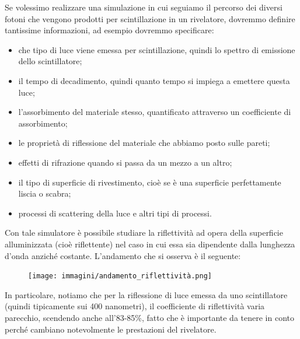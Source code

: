 Se volessimo realizzare una simulazione in cui seguiamo il percorso dei diversi fotoni che vengono prodotti per scintillazione in un rivelatore, dovremmo definire tantissime informazioni, ad esempio dovremmo specificare:

\begin{itemize}
   \item che tipo di luce viene emessa per scintillazione, quindi lo spettro di emissione dello scintillatore;
   \item il tempo di decadimento, quindi quanto tempo si impiega a emettere questa luce;
   \item l'assorbimento del materiale stesso, quantificato attraverso un coefficiente di assorbimento;
   \item le proprietà di riflessione del materiale che abbiamo posto sulle pareti;
   \item effetti di rifrazione quando si passa da un mezzo a un altro;
   \item il tipo di superficie di rivestimento, cioè se è una superficie perfettamente liscia o scabra;
   \item processi di scattering della luce e altri tipi di processi.
\end{itemize}

\begin{esempio}
   Con tale simulatore è possibile studiare la riflettività ad opera della superficie alluminizzata (cioè riflettente) nel caso in cui essa sia dipendente dalla lunghezza d'onda anziché costante. L'andamento che si osserva è il seguente:
   \begin{figure}[H]
      \centering
      \texttt{[image: immagini/andamento\_riflettività.png]}
   \end{figure}
   In particolare, notiamo che per la riflessione di luce emessa da uno scintillatore (quindi tipicamente sui 400 nanometri), il coefficiente di riflettività varia parecchio, scendendo anche all'83-85\%, fatto che è importante da tenere in conto perché cambiano notevolmente le prestazioni del rivelatore.
\end{esempio}

